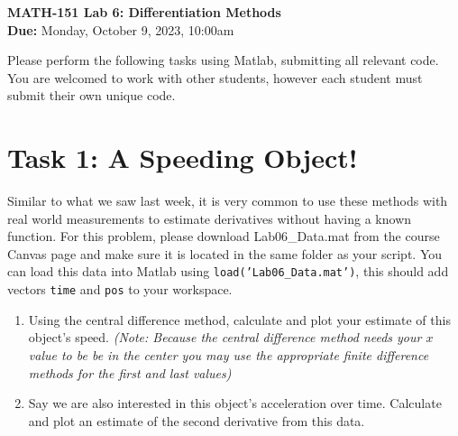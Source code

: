 \documentclass[11pt]{article}
\begin{document}
	
	\begin{center}
		\Large{\textbf{MATH-151 Lab 6: Differentiation Methods}}\\
			\medskip
		\normalsize{\textbf{Due:} Monday, October 9, 2023, 10:00am} 
	\end{center}
	\noindent\makebox[\linewidth]{\rule{\textwidth}{0.4pt}}
	Please perform the following tasks using Matlab, submitting all relevant code. You are welcomed to work with other students, however each student must submit their own unique code.
	\section*{Task 1: A Speeding Object!}
	\noindent Similar to what we saw last week, it is very common to use these methods with real world measurements to estimate derivatives without having a known function. For this problem, please download Lab06\_Data.mat from the course Canvas page and make sure it is located in the same folder as your script. You can load this data into Matlab using \texttt{load('Lab06\_Data.mat')}, this should add vectors \texttt{time} and \texttt{pos} to your workspace. 
	\begin{enumerate}[label=\alph*)]
		\item Using the central difference method, calculate and plot your estimate of this object's speed. \textit{(Note: Because the central difference method needs your $x$ value to be be in the center you may use the appropriate finite difference methods for the first and last values)}
		\item Say we are also interested in this object's acceleration over time. Calculate and plot an estimate of the second derivative from this data.
	\end{enumerate}
\end{document}

